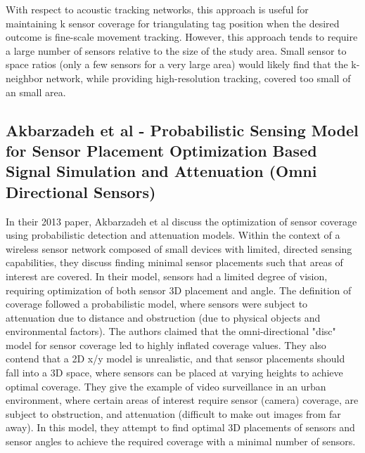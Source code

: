 With respect to acoustic tracking networks, this approach is useful for maintaining k sensor coverage for triangulating tag position when the desired outcome is fine-scale movement tracking.  However, this approach tends to require a large number of sensors relative to the size of the study area.  Small sensor to space ratios (only a few sensors for a very large area) would likely find that the k-neighbor network, while providing high-resolution tracking, covered too small of an small area.



\subsection{Akbarzadeh et al - Probabilistic Sensing Model for Sensor Placement Optimization Based Signal Simulation and Attenuation (Omni Directional Sensors)}
In their 2013 paper, Akbarzadeh et al\cite{Akbarzadeh2013} discuss the optimization of sensor coverage using probabilistic detection and attenuation models.  Within the context of a wireless sensor network composed of small devices with limited, directed sensing capabilities, they discuss finding minimal sensor placements such that areas of interest are covered.  In their model, sensors had a limited degree of vision, requiring optimization of both sensor 3D placement and angle.  The definition of coverage followed a probabilistic model, where sensors were subject to attenuation due to distance and obstruction (due to physical objects and environmental factors).  The authors claimed that the omni-directional "disc" model for sensor coverage led to highly inflated coverage values.  They also contend that a 2D x/y model is unrealistic, and that sensor placements should fall into a 3D space, where sensors can be placed at varying heights to achieve optimal coverage.  They give the example of video surveillance in an urban environment, where certain areas of interest require sensor (camera) coverage, are subject to obstruction, and attenuation (difficult to make out images from far away).  In this model, they attempt to find optimal 3D placements of sensors and sensor angles to achieve the required coverage with a minimal number of sensors. 

